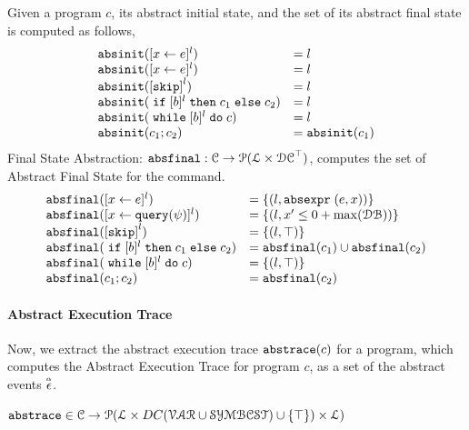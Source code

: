 %
Given a program $c$, its abstract initial state,
and the set of its abstract final state is computed as follows,
%
\[
  \begin{array}{ll}
    \absinit(\clabel{\assign{x}{\expr}}{}^l)  & = l  \\
    \absinit(\clabel{\assign{x}{\expr}}{}^l)  & = l \\
    \absinit(\clabel{\eskip}^{l})  & = l \\
    \absinit(\eif [b]^l \ethen c_1 \eelse c_2)  & = l \\
    \absinit(\ewhile [b]^l \edo c)  & = l \\
    \absinit(c_1 ; c_2)  & = \absinit(c_1) \\
 \end{array}
 \]
%
Final State Abstraction: 
$\mathtt{abs}{\mathtt{final}}: \mathcal{C} \to \mathcal{P}(\mathcal{L} \times \mathcal{DC}^{\top})$,
computes the set of Abstract Final State for the command. 
 \[
  \begin{array}{ll}
    \absfinal(\clabel{\assign{x}{\expr}}{}^l)  & = \{(l, \absexpr\eapp (\expr, x))\}  \\
     \absfinal(\clabel{\assign{x}{\query(\qexpr)}}{}^l)  & = \{
      (l, x' \leq 0 + \max(\dbdom) )\}  \\
     \absfinal(\clabel{\eskip}^{l})  
     & = \{(l, \top)\} \\
     \absfinal(\eif [b]^l \ethen c_1 \eelse c_2)  & = \absfinal(c_1) \cup \absfinal(c_2) \\
     \absfinal(\ewhile [b]^l \edo c)  & = \{(l, \top)\} \\
     \absfinal(c_1 ; c_2)  & =  \absfinal(c_2) \\
 \end{array}
 \]
 \paragraph{Abstract Execution Trace}
 Now, we  extract the abstract execution trace  $\mathtt{abs}{\mathtt{trace}}(c)$ for a program, which computes the Abstract Execution Trace for program $c$, as a set of the abstract events $\stackrel{\scriptscriptstyle{\alpha}}{\mathtt{\epsilon}{}}$.
 \begin{defn}
 \label{def:abs_trace}
  $\mathtt{abs}{\mathtt{trace}} \in \mathcal{C} \to \mathcal{P}( \mathcal{L} \times DC(\mathcal{VAR}  \cup \mathcal{SYMBCST}) \cup \{\top\}) \times \mathcal{L} )$
  \end{defn}

